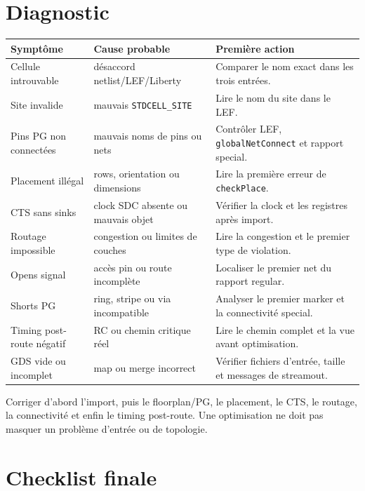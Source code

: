 \documentclass[11pt,a4paper,openany]{report}
\begin{document}
\chapter{Diagnostic}

\begin{longtable}{p{}p{}p{}}
\toprule
Symptôme & Cause probable & Première action \\
\midrule
Cellule introuvable & désaccord netlist/LEF/Liberty &
Comparer le nom exact dans les trois entrées. \\
Site invalide & mauvais \texttt{STDCELL\_SITE} &
Lire le nom du site dans le LEF. \\
Pins PG non connectées & mauvais noms de pins ou nets &
Contrôler LEF, \texttt{globalNetConnect} et rapport special. \\
Placement illégal & rows, orientation ou dimensions &
Lire la première erreur de \texttt{checkPlace}. \\
CTS sans sinks & clock SDC absente ou mauvais objet &
Vérifier la clock et les registres après import. \\
Routage impossible & congestion ou limites de couches &
Lire la congestion et le premier type de violation. \\
Opens signal & accès pin ou route incomplète &
Localiser le premier net du rapport regular. \\
Shorts PG & ring, stripe ou via incompatible &
Analyser le premier marker et la connectivité special. \\
Timing post-route négatif & RC ou chemin critique réel &
Lire le chemin complet et la vue avant optimisation. \\
GDS vide ou incomplet & map ou merge incorrect &
Vérifier fichiers d'entrée, taille et messages de streamout. \\
\bottomrule
\end{longtable}

\begin{failurebox}
Corriger d'abord l'import, puis le floorplan/PG, le placement, le CTS, le
routage, la connectivité et enfin le timing post-route. Une optimisation ne
doit pas masquer un problème d'entrée ou de topologie.
\end{failurebox}

\appendix
\chapter{Checklist finale}
\end{document}
